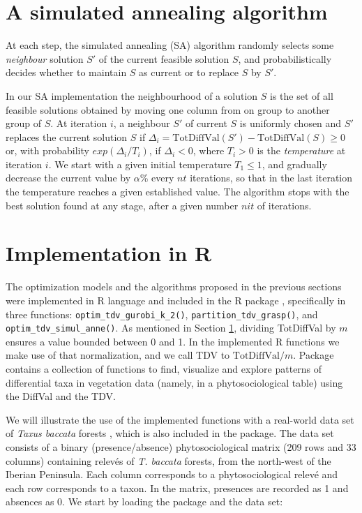 \section{A simulated annealing algorithm}\label{SA}

At each step, the simulated annealing (SA) algorithm \citep{KGV1983, AKL1997} randomly selects some \emph{neighbour} solution \(S'\) of the current feasible solution \(S\), and probabilistically decides whether to maintain \(S\) as current or to replace \(S\) by \(S'\).

In our SA implementation the neighbourhood of a solution \(S\) is the set of all feasible solutions obtained by moving one column from on group to another group of \(S\).
At iteration \(i\), a neighbour \(S'\) of current \(S\) is uniformly chosen and \(S'\) replaces the current solution \(S\) if \(\Delta_i= \mathrm{TotDiffVal}(S')- \mathrm{TotDiffVal}(S)\geq 0\) or, with probability \(exp(\Delta_i/T_i)\), if \(\Delta_i<0\), where \(T_i>0\) is the \emph{temperature} at iteration \(i\). We start with a given initial temperature \(T_1\leq 1\), and gradually decrease the current value by \(\alpha\)\% every \(nt\) iterations, so that in the last iteration the temperature reaches a given established value. The algorithm stops with the best solution found at any stage, after a given number \(nit\) of iterations.

\section{Implementation in R}\label{implementation}

The optimization models and the algorithms proposed in the previous sections were implemented in R language and included in the R package , specifically in three functions: \texttt{optim\_tdv\_gurobi\_k\_2()}, \texttt{partition\_tdv\_grasp()}, and \texttt{optim\_tdv\_simul\_anne()}. As mentioned in Section \hyperref[intro]{1}, dividing TotDiffVal by \(m\) ensures a value bounded between 0 and 1. In the implemented R functions we make use of that normalization, and we call TDV to \(\mathrm{TotDiffVal}/m\). Package  contains a collection of functions to find, visualize and explore patterns of differential taxa in vegetation data (namely, in a phytosociological table) using the DiffVal and the TDV.

We will illustrate the use of the implemented functions with a real-world data set of \emph{Taxus baccata} forests \citep[from][]{PEMCFGFN21}, which is also included in the package. The data set consists of a binary (presence/absence) phytosociological matrix (209 rows and 33 columns) containing relevés of \emph{T. baccata} forests, from the north-west of the Iberian Peninsula. Each column corresponds to a phytosociological relevé and each row corresponds to a taxon. In the matrix, presences are recorded as 1 and absences as 0. We start by loading the package and the data set:

